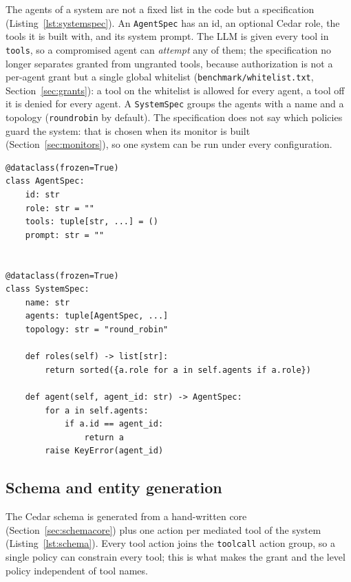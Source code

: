 \documentclass[11pt,a4paper]{article}
\DeclareRobustCommand{\code}[1]{{\renewcommand{\_}{\textunderscore\allowbreak}\texttt{#1}}}
\begin{document}
The agents of a system are not a fixed list in the code but a specification
(Listing~\ref{lst:systemspec}). An \code{AgentSpec} has an id, an optional Cedar role, the
tools it is built with, and its system prompt. The LLM is given every tool in
\code{tools}, so a compromised agent can \emph{attempt} any of them; the specification no
longer separates granted from ungranted tools, because authorization is not a per-agent
grant but a single global whitelist (\code{benchmark/whitelist.txt},
Section~\ref{sec:grants}): a tool on the whitelist is allowed for every agent, a tool off
it is denied for every agent. A \code{SystemSpec} groups the agents with a name and a
topology (\code{round\_robin} by default). The specification does not say which policies
guard the system: that is chosen when its monitor is built (Section~\ref{sec:monitors}),
so one system can be run under every configuration.

\begin{lstlisting}[firstnumber=4,style=py,caption={System and agent specifications (\texttt{engine/system.py}, lines 4--26)},label={lst:systemspec}]
@dataclass(frozen=True)
class AgentSpec:
    id: str
    role: str = ""
    tools: tuple[str, ...] = ()
    prompt: str = ""


@dataclass(frozen=True)
class SystemSpec:
    name: str
    agents: tuple[AgentSpec, ...]
    topology: str = "round_robin"

    def roles(self) -> list[str]:
        return sorted({a.role for a in self.agents if a.role})

    def agent(self, agent_id: str) -> AgentSpec:
        for a in self.agents:
            if a.id == agent_id:
                return a
        raise KeyError(agent_id)
\end{lstlisting}

\subsection{Schema and entity generation}
\label{sec:schema}

The Cedar schema is generated from a hand-written core
(Section~\ref{sec:schemacore}) plus one action per mediated tool of the system
(Listing~\ref{lst:schema}). Every tool action joins the \code{tool\_call} action group, so
a single policy can constrain every tool; this is what makes the grant and the level
policy independent of tool names.
\end{document}
